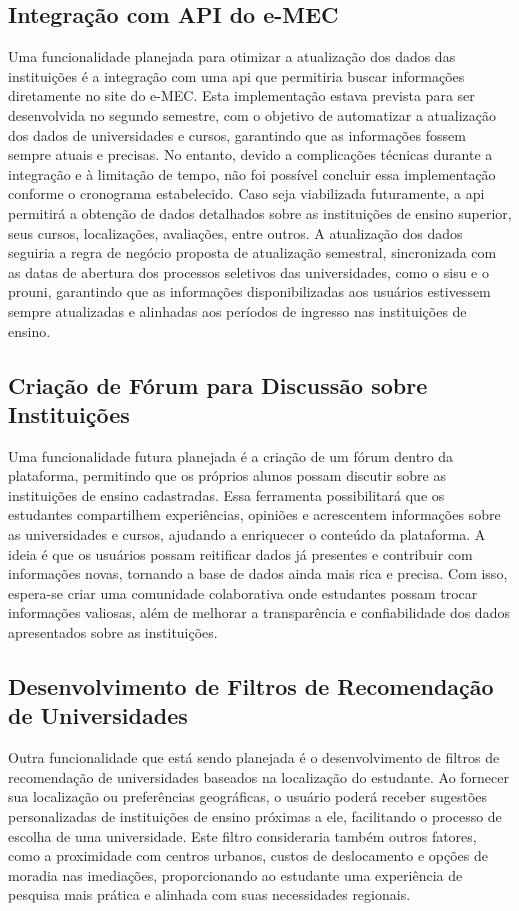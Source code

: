 \subsection{Integração com API do e-MEC}
Uma funcionalidade planejada para otimizar a atualização dos dados das instituições é a integração com uma \ac{api} que permitiria buscar informações diretamente no site do e-MEC. Esta implementação estava prevista para ser desenvolvida no segundo semestre, com o objetivo de automatizar a atualização dos dados de universidades e cursos, garantindo que as informações fossem sempre atuais e precisas. No entanto, devido a complicações técnicas durante a integração e à limitação de tempo, não foi possível concluir essa implementação conforme o cronograma estabelecido. Caso seja viabilizada futuramente, a \ac{api} permitirá a obtenção de dados detalhados sobre as instituições de ensino superior, seus cursos, localizações, avaliações, entre outros. A atualização dos dados seguiria a regra de negócio proposta de atualização semestral, sincronizada com as datas de abertura dos processos seletivos das universidades, como o \ac{sisu} e o \ac{prouni}, garantindo que as informações disponibilizadas aos usuários estivessem sempre atualizadas e alinhadas aos períodos de ingresso nas instituições de ensino.

\subsection{Criação de Fórum para Discussão sobre Instituições}
Uma funcionalidade futura planejada é a criação de um fórum dentro da plataforma, permitindo que os próprios alunos possam discutir sobre as instituições de ensino cadastradas. Essa ferramenta possibilitará que os estudantes compartilhem experiências, opiniões e acrescentem informações sobre as universidades e cursos, ajudando a enriquecer o conteúdo da plataforma. A ideia é que os usuários possam reitificar dados já presentes e contribuir com informações novas, tornando a base de dados ainda mais rica e precisa. Com isso, espera-se criar uma comunidade colaborativa onde estudantes possam trocar informações valiosas, além de melhorar a transparência e confiabilidade dos dados apresentados sobre as instituições.

\subsection{Desenvolvimento de Filtros de Recomendação de Universidades}
Outra funcionalidade que está sendo planejada é o desenvolvimento de filtros de recomendação de universidades baseados na localização do estudante. Ao fornecer sua localização ou preferências geográficas, o usuário poderá receber sugestões personalizadas de instituições de ensino próximas a ele, facilitando o processo de escolha de uma universidade. Este filtro consideraria também outros fatores, como a proximidade com centros urbanos, custos de deslocamento e opções de moradia nas imediações, proporcionando ao estudante uma experiência de pesquisa mais prática e alinhada com suas necessidades regionais.

